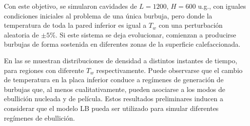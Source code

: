 Con este objetivo, se simularon cavidades de $L=1200$, $H=600$ u.g., con iguales condiciones iniciales al problema de una \'unica burbuja, pero donde la temperatura de toda la pared inferior es igual a $T_w$ con una perturbaci\'on aleatoria de $\pm5\%$. Si este sistema se deja evolucionar, comienzan a producirse burbujas de forma sostenida en diferentes zonas de la superficie calefaccionada.

En las  se muestran distribuciones de densidad a distintos instantes de tiempo, para regiones con diferente $T_w$ respectivamente. Puede observarse que el cambio de temperatura en la placa inferior conduce a reg\'imenes de generaci\'on de burbujas que, al menos cualitativamente, pueden asociarse a los modos de ebullici\'on nucleada y de pel\'icula. Estos resultados preliminares inducen a considerar que el modelo LB pueda ser utilizado para simular diferentes reg\'imenes de ebullici\'on. 

